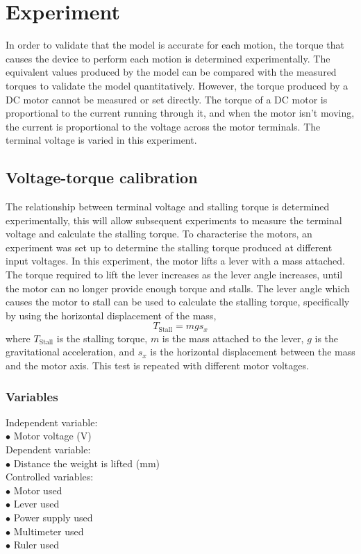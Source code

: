 \chapter{Experiment}

In order to validate that the model is accurate for each motion, the torque that causes the device to perform each motion is determined experimentally. The equivalent values produced by the model can be compared with the measured torques to validate the model quantitatively. However, the torque produced by a DC motor cannot be measured or set directly. The torque of a DC motor is proportional to the current running through it, and when the motor isn't moving, the current is proportional to the voltage across the motor terminals. The terminal voltage is varied in this experiment.

\section{Voltage-torque calibration} \label{sec:Voltage-torque calibration}
The relationship between terminal voltage and stalling torque is determined experimentally, this will allow subsequent experiments to measure the terminal voltage and calculate the stalling torque.
To characterise the motors, an experiment was set up to determine the stalling torque produced at different input voltages. In this experiment, the motor lifts a lever with a mass attached. The torque required to lift the lever increases as the lever angle increases, until the motor can no longer provide enough torque and stalls. The lever angle which causes the motor to stall can be used to calculate the stalling torque, specifically by using the horizontal displacement of the mass,
\begin{equation}
	T_\mathrm{Stall} = m g s_x
\end{equation}
where $T_\mathrm{Stall}$ is the stalling torque, $m$ is the mass attached to the lever, $g$ is the gravitational acceleration, and $s_x$ is the horizontal displacement between the mass and the motor axis.
This test is repeated with different motor voltages.\\

\subsection{Variables}
Independent variable:\\
$\bullet$ Motor voltage (V)\\
Dependent variable:\\
$\bullet$ Distance the weight is lifted (mm)\\
Controlled variables:\\
$\bullet$ Motor used\\
$\bullet$ Lever used\\
$\bullet$ Power supply used\\
$\bullet$ Multimeter used\\
$\bullet$ Ruler used\\


